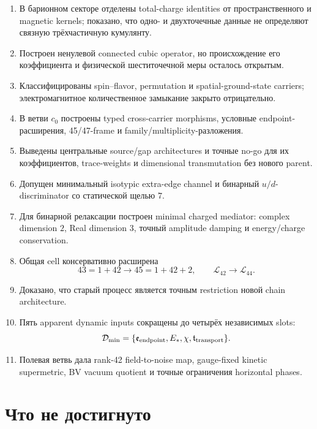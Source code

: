 \begin{enumerate}
 \item В барионном секторе отделены total-charge identities от
 пространственного и magnetic kernels; показано, что одно- и двухточечные
 данные не определяют связную трёхчастичную кумулянту.
 \item Построен ненулевой connected cubic operator, но происхождение его
 коэффициента и физической шеститочечной меры осталось открытым.
 \item Классифицированы spin--flavor, permutation и spatial-ground-state
 carriers; электромагнитное количественное замыкание закрыто отрицательно.
 \item В ветви $c_0$ построены typed cross-carrier morphisms, условные
 endpoint-расширения, 45/47-frame и family/multiplicity-разложения.
 \item Выведены центральные source/gap architectures и точные no-go для их
 коэффициентов, trace-weights и dimensional transmutation без нового
 parent.
 \item Допущен минимальный isotypic extra-edge channel и бинарный
 $u/d$-discriminator со статической щелью $7$.
 \item Для бинарной релаксации построен minimal charged mediator: complex
 dimension $2$, Real dimension $3$, точный amplitude damping и
 energy/charge conservation.
 \item Общая cell консервативно расширена
 \begin{equation}
  43=1+42\longrightarrow45=1+42+2,
  \qquad \mathcal L_{42}\longrightarrow\mathcal L_{44}.
  \label{eq:v8-final-cell-extension}
 \end{equation}
 \item Доказано, что старый процесс является точным restriction новой
 chain architecture.
 \item Пять apparent dynamic inputs сокращены до четырёх независимых slots:
 \begin{equation}
  \mathcal D_{\min}=
  \{\mathfrak e_{\rm endpoint},E_*,\chi,
  \mathfrak t_{\rm transport}\}.
  \label{eq:v8-final-four-slot-data}
 \end{equation}
 \item Полевая ветвь дала rank-42 field-to-noise map, gauge-fixed kinetic
 supermetric, BV vacuum quotient и точные ограничения horizontal phases.
\end{enumerate}

\section{Что не достигнуто}

